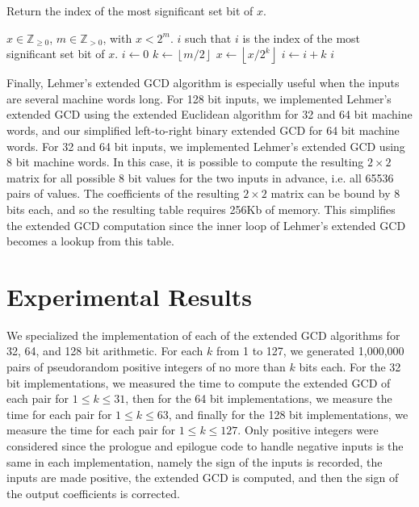 \documentclass{ucalgthes1}
\theoremstyle{definition}
\newcommand{\ZZgtz}{\mathbb{Z}_{>0}}
\newcommand{\ZZgez}{\mathbb{Z}_{\ge 0}}
\newcommand{\floor}[1]{\left\lfloor #1 \right\rfloor}
\begin{document}
\begin{algorithm}[htb]
\caption{Return the index of the most significant set bit of $x$.}
\label{alg:msb}
\begin{algorithmic}[1]
\Require $x \in \ZZgez$, $m \in \ZZgtz$, with $x < 2^m$.
\Ensure $i$ such that $i$ is the index of the most significant set bit of $x$.
\State $i \gets 0$
\State $k \gets \floor{m/2}$ 
		\State $x \gets \floor{x / 2^k}$
		\State $i \gets i + k$
	\EndIf
\EndWhile
\State \Return $i$
\end{algorithmic}
\end{algorithm}

Finally, Lehmer's extended GCD algorithm is especially useful when the inputs are several machine words long.  For 128 bit inputs, we implemented Lehmer's extended GCD using the extended Euclidean algorithm for 32 and 64 bit machine words, and our simplified left-to-right binary extended GCD for 64 bit machine words.  For 32 and 64 bit inputs, we implemented Lehmer's extended GCD using 8 bit machine words.  In this case, it is possible to compute the resulting $2 \times 2$ matrix for all possible 8 bit values for the two inputs in advance, i.e. all 65536 pairs of values.  The coefficients of the resulting $2 \times 2$ matrix can be bound by 8 bits each, and so the resulting table requires 256Kb of memory. This simplifies the extended GCD computation since the inner loop of Lehmer's extended GCD becomes a lookup from this table.

\section{Experimental Results}
\label{sec:gcdResults}

We specialized the implementation of each of the extended GCD algorithms for 32, 64, and 128 bit arithmetic.  For each $k$ from 1 to 127, we generated 1,000,000 pairs of pseudorandom positive integers of no more than $k$ bits each.  For the 32 bit implementations, we measured the time to compute the extended GCD of each pair for $1 \le k \le 31$, then for the 64 bit implementations, we measure the time for each pair for $1 \le k \le 63$, and finally for the 128 bit implementations, we measure the time for each pair for $1 \le k \le 127$.  Only positive integers were considered since the prologue and epilogue code to handle negative inputs is the same in each implementation, namely the sign of the inputs is recorded, the inputs are made positive, the extended GCD is computed, and then the sign of the output coefficients is corrected.  
\end{document}
